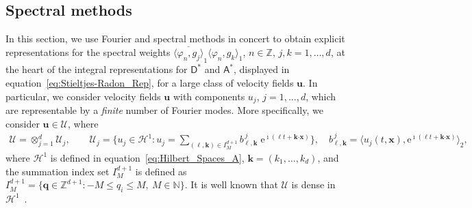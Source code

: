 \documentclass[leqno,onefignum,onetabnum]{siamltex1213}
\newcommand{\e}{\mathrm{e}}
\newcommand{\Uc}{\mathcal{U}}
\newcommand{\Dm}{\mathsf{D}}
\newcommand{\Am}{\mathsf{A}}
\newcommand{\Hs}{\mathscr{H}}
\providecommand\bcdot{\boldsymbol{\cdot}}
\newcommand{\vecx}{\boldsymbol{x}}
\newcommand{\vecu}{\boldsymbol{u}}
\newcommand{\veck}{\boldsymbol{k}}
\newcommand{\vecq}{\boldsymbol{q}}
\begin{document}
%
\subsection{Spectral methods}
\label{sec:Spectral_Fourier_Methods}
%
In this section, we use Fourier and spectral methods in concert to
obtain explicit representations for the spectral weights
$\overline{\langle\varphi_n,g_j\rangle}_1\langle\varphi_n,g_k\rangle_1$, $n\in\mathbb{Z}$, $j,k=1,\ldots,d$, at
the heart of the integral representations for $\Dm^*$ and
$\Am^*$, displayed in equation~\eqref{eq:Stieltjes-Radon_Rep}, for
a large class of velocity fields $\vecu $. In particular, we consider
velocity fields $\vecu $ with components $u_j$, $j=1,\ldots,d$, which are
representable by a \emph{finite} number of Fourier modes. More
specifically, we consider $\vecu \in\Uc$, where 
%
\begin{align}\label{eq:velocity_field_space}
  \Uc=\otimes_{j=1}^d\Uc_j, \qquad
  \Uc_j=\Big\{u_j\in\Hs^1:u_j=\sum_{(\ell,\veck)\in I_M^{d+1}}b^{\,j}_{\ell,\veck}\;\e^{\imath(\ell t+\veck\bcdot\vecx)}\Big\},
   \quad
  b^{\,j}_{\ell,\veck}=\big\langle u_j(t,\vecx),\e^{\imath(\ell t+\veck\bcdot\vecx)}\big\rangle_2, 
\end{align}
%
where $\Hs^1$ is defined in equation~\eqref{eq:Hilbert_Spaces_A},
$\veck=(k_1,\ldots,k_d)$, and the summation index set $I_M^{d+1}$ is defined as
$I_M^{d+1}=\{\vecq\in\mathbb{Z}^{d+1}:-M\leq q_i\leq M, \ M\in\mathbb{N}\}$. It is well
known that $\Uc$ is dense in $\Hs^1$~\cite{Folland:99:RealAnalysis}. 
\end{document}
